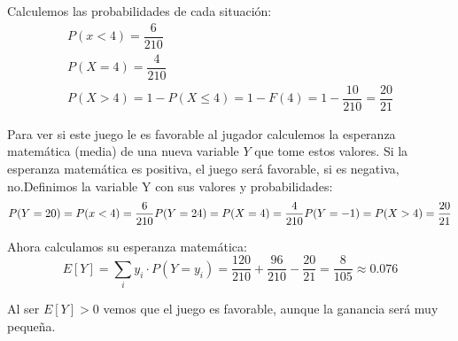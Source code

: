 Calculemos las probabilidades de cada situación:
\begin{gather*}
    P(x<4) = \dfrac{6}{210}\\
    P(X=4) = \dfrac{4}{210}\\
    P(X>4) = 1 - P(X \leq 4) = 1 - F(4) = 1 - \dfrac{10}{210} = \dfrac{20}{21}
\end{gather*}

Para ver si este juego le es favorable al jugador calculemos la esperanza matemática (media) de una nueva variable $Y$ que tome estos valores. Si la esperanza matemática es positiva, el juego será favorable, si es negativa, no.Definimos la variable Y con sus valores y probabilidades:
\begin{equation*}
    P(Y = 20) = P(x<4) = \dfrac{6}{210}\\
    P(Y = 24) = P(X=4) = \dfrac{4}{210}\\
    P(Y = -1) = P(X>4) = \dfrac{20}{21}
\end{equation*}

Ahora calculamos su esperanza matemática:
\begin{equation*}
    E[Y] = \sum_i y_i \cdot P(Y=y_i) = \dfrac{120}{210} + \dfrac{96}{210} - \dfrac{20}{21} = \dfrac{8}{105} \approx 0.076
\end{equation*}

Al ser $E[Y] > 0$ vemos que el juego es favorable, aunque la ganancia será muy pequeña.
